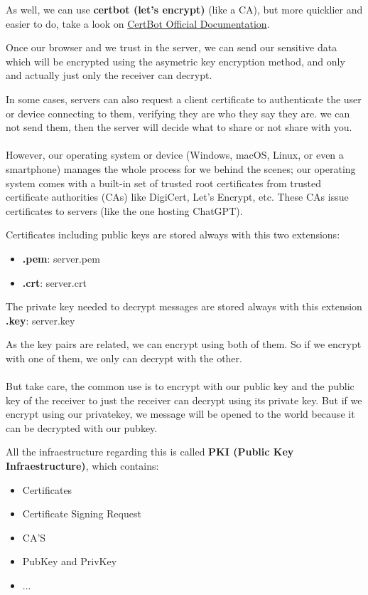 \documentclass{article}
\newenvironment{blocktemplateI}[1]{%
    \tcolorbox[beamer,%
    noparskip,breakable,
    colframe=Violet,%
    colbacklower=Black,%
    title=#1]}%
    {\endtcolorbox}
\begin{document}
As well, we can use \textbf{certbot (let's encrypt)} (like a CA), but more quicklier and easier to do, take a look on \href{https://certbot.eff.org/}{CertBot Official Documentation}.

Once our browser and we trust in the server, we can send our sensitive data which will be encrypted using the asymetric key encryption method, and only and actually just only the receiver can decrypt.

\begin{blocktemplateI}{Note}
In some cases, servers can also request a client certificate to authenticate the user or device connecting to them, verifying they are who they say they are. we can not send them, then the server will decide what to share or not share with you.
\\\\
However, our operating system or device (Windows, macOS, Linux, or even a smartphone) manages the whole process for we behind the scenes; our operating system comes with a built-in set of trusted root certificates from trusted certificate authorities (CAs) like DigiCert, Let's Encrypt, etc. These CAs issue certificates to servers (like the one hosting ChatGPT).
\end{blocktemplateI}

Certificates including public keys are stored always with this two extensions: 
\begin{itemize}
    \item \textbf{.pem}: server.pem
    \item \textbf{.crt}: server.crt
\end{itemize}

The private key needed to decrypt messages are stored always with this extension \textbf{.key}: server.key

\begin{blocktemplateI}{Note}
As the key pairs are related, we can encrypt using both of them. So if we encrypt with one of them, we only can decrypt with the other.
\\\\
But take care, the common use is to encrypt with our public key and the public key of the receiver to just the receiver can decrypt using its private key. But if we encrypt using our privatekey, we message will be opened to the world because it can be decrypted with our pubkey.
\end{blocktemplateI}

All the infraestructure regarding this is called \textbf{PKI (Public Key Infraestructure)}, which contains:
\begin{itemize}
    \item Certificates
    \item Certificate Signing Request
    \item CA'S
    \item PubKey and PrivKey
    \item ...
\end{itemize}
\end{document}
